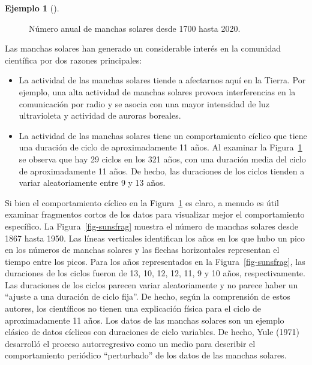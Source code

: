 \documentclass[
  us-letterpaper,
]{scrreprt}
\theoremstyle{definition}
\newtheorem{example}{Ejemplo}[chapter]
\theoremstyle{plain}
\theoremstyle{plain}
\theoremstyle{definition}
\theoremstyle{remark}
\begin{document}
\begin{example}[]
\begin{tcolorbox}
\begin{figure}[H]
{}

\caption{\label{fig-sunspot}Número anual de manchas solares desde 1700
hasta 2020.}

\end{figure}%

Las manchas solares han generado un considerable interés en la comunidad
científica por dos razones principales:

\begin{itemize}
\item
  La actividad de las manchas solares tiende a afectarnos aquí en la
  Tierra. Por ejemplo, una alta actividad de manchas solares provoca
  interferencias en la comunicación por radio y se asocia con una mayor
  intensidad de luz ultravioleta y actividad de auroras boreales.
\item
  La actividad de las manchas solares tiene un comportamiento cíclico
  que tiene una duración de ciclo de aproximadamente 11 años. Al
  examinar la Figura~\ref{fig-sunspot} se observa que hay 29 ciclos en
  los 321 años, con una duración media del ciclo de aproximadamente 11
  años. De hecho, las duraciones de los ciclos tienden a variar
  aleatoriamente entre 9 y 13 años.
\end{itemize}

Si bien el comportamiento cíclico en la Figura~\ref{fig-sunspot} es
claro, a menudo es útil examinar fragmentos cortos de los datos para
visualizar mejor el comportamiento específico. La
Figura~\ref{fig-sunsfrag} muestra el número de manchas solares desde
1867 hasta 1950. Las líneas verticales identifican los años en los que
hubo un pico en los números de manchas solares y las flechas
horizontales representan el tiempo entre los picos. Para los años
representados en la Figura~\ref{fig-sunsfrag}, las duraciones de los
ciclos fueron de 13, 10, 12, 12, 11, 9 y 10 años, respectivamente. Las
duraciones de los ciclos parecen variar aleatoriamente y no parece haber
un ``ajuste a una duración de ciclo fija''. De hecho, según la
comprensión de estos autores, los científicos no tienen una explicación
física para el ciclo de aproximadamente 11 años. Los datos de las
manchas solares son un ejemplo clásico de datos cíclicos con duraciones
de ciclo variables. De hecho, Yule (1971) desarrolló el proceso
autorregresivo como un medio para describir el comportamiento periódico
``perturbado'' de los datos de las manchas solares.

\begin{figure}[H]

\centering{

}
\end{figure}
\end{tcolorbox}
\end{example}
\end{document}
